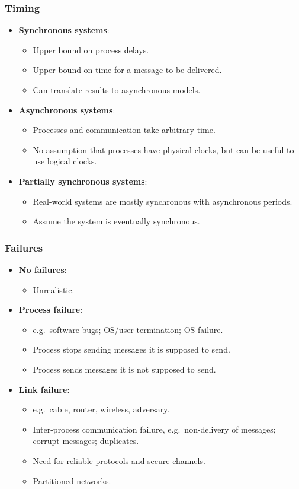 \documentclass[11pt]{article}
\begin{document}
\subsubsection{Timing}
\begin{itemize}
  \item \textbf{Synchronous systems}:
    \begin{itemize}
      \item Upper bound on process delays.
      \item Upper bound on time for a message to be delivered.
      \item Can translate results to asynchronous models.
    \end{itemize}
  \item \textbf{Asynchronous systems}:
    \begin{itemize}
      \item Processes and communication take arbitrary time.
      \item No assumption that processes have physical clocks, but can be useful to use logical clocks.
    \end{itemize}
  \item \textbf{Partially synchronous systems}:
    \begin{itemize}
      \item Real-world systems are mostly synchronous with asynchronous periods.
      \item Assume the system is eventually synchronous.
    \end{itemize}
\end{itemize}

\subsubsection{Failures}
\begin{itemize}
  \item \textbf{No failures}:
    \begin{itemize}
      \item Unrealistic.
    \end{itemize}
  \item \textbf{Process failure}:
    \begin{itemize}
      \item e.g.\ software bugs; OS/user termination; OS failure.
      \item Process stops sending messages it is supposed to send.
      \item Process sends messages it is not supposed to send.
    \end{itemize}
  \item \textbf{Link failure}:
    \begin{itemize}
      \item e.g.\ cable, router, wireless, adversary.
      \item Inter-process communication failure, e.g.\ non-delivery of messages; corrupt messages; duplicates.
      \item Need for reliable protocols and secure channels.
      \item Partitioned networks.
    \end{itemize}
\end{itemize}
\end{document}
